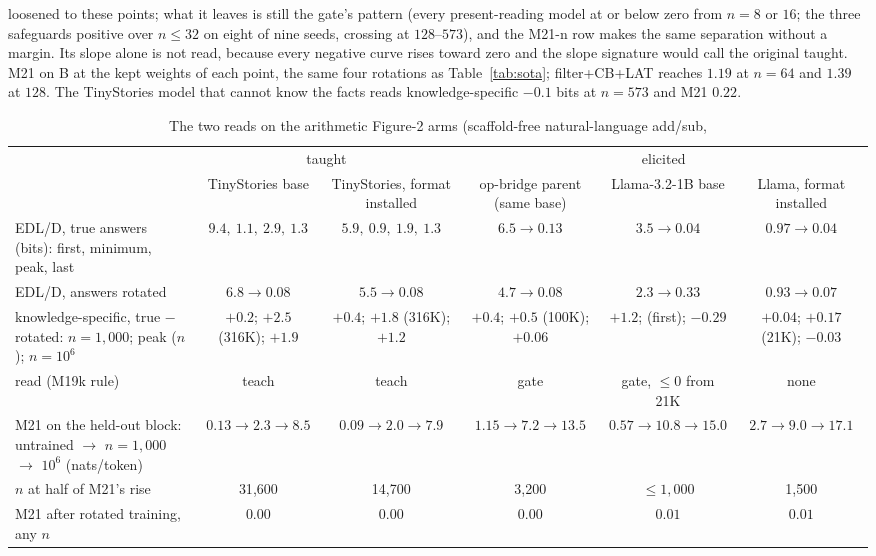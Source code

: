 \documentclass[11pt]{article}
\begin{document}
\begin{table}[!htbp]
{loosened to these points; what it leaves is still the gate's pattern (every present-reading model
at or below zero from $n=8$ or $16$; the three safeguards positive over $n\le32$ on eight of nine
seeds, crossing at $128$--$573$), and the M21-n row makes the same separation without a margin.
Its slope alone is not read, because every negative curve rises toward zero and the slope signature
would call the original taught. M21 on B at the kept weights of each point, the same four rotations
as Table~\ref{tab:sota}; filter+CB+LAT reaches $1.19$ at $n=64$ and $1.39$ at $128$. The TinyStories
model that cannot know the facts reads knowledge-specific $-0.1$ bits at $n=573$ and M21 $0.22$.}
\label{tab:costs}
\end{table}

\begin{table}[!htbp]\centering\footnotesize\setlength{\tabcolsep}{3pt}
\begin{adjustbox}{max width=\textwidth}
\begin{tabular}{@{}lcc|ccc@{}}
\toprule
 & \multicolumn{2}{c|}{taught} & \multicolumn{3}{c}{elicited} \tabularnewline
 & TinyStories base & TinyStories, format installed & op-bridge parent (same base) & Llama-3.2-1B base & Llama, format installed \tabularnewline
\midrule
EDL/D, true answers (bits): first, minimum, peak, last & $9.4,\ 1.1,\ \mathbf{2.9},\ 1.3$ & $5.9,\ 0.9,\ \mathbf{1.9},\ 1.3$ & $6.5 \to 0.13$ & $3.5 \to 0.04$ & $0.97 \to 0.04$ \tabularnewline
EDL/D, answers rotated & $6.8 \to 0.08$ & $5.5 \to 0.08$ & $4.7 \to 0.08$ & $2.3 \to 0.33$ & $0.93 \to 0.07$ \tabularnewline
knowledge-specific, true $-$ rotated: $n{=}1{,}000$; peak ($n$); $n{=}10^6$ & $+0.2$; $\mathbf{+2.5}$ (316K); $+1.9$ & $+0.4$; $\mathbf{+1.8}$ (316K); $+1.2$ & $+0.4$; $+0.5$ (100K); $+0.06$ & $\mathbf{+1.2}$; (first); $-0.29$ & $+0.04$; $+0.17$ (21K); $-0.03$ \tabularnewline
read (M19k rule) & teach & teach & gate & gate, $\le0$ from 21K & none \tabularnewline
M21 on the held-out block: untrained $\to$ $n{=}1{,}000$ $\to$ $10^6$ (nats/token) & $0.13 \to 2.3 \to 8.5$ & $0.09 \to 2.0 \to 7.9$ & $1.15 \to 7.2 \to 13.5$ & $0.57 \to 10.8 \to 15.0$ & $2.7 \to 9.0 \to 17.1$ \tabularnewline
$n$ at half of M21's rise & 31{,}600 & 14{,}700 & 3{,}200 & $\le 1{,}000$ & 1{,}500 \tabularnewline
M21 after rotated training, any $n$ & $0.00$ & $0.00$ & $0.00$ & $0.01$ & $0.01$ \tabularnewline
\bottomrule
\end{tabular}
\end{adjustbox}
\caption{The two reads on the arithmetic Figure-2 arms (scaffold-free natural-language add/sub,
}
\end{table}
\end{document}
